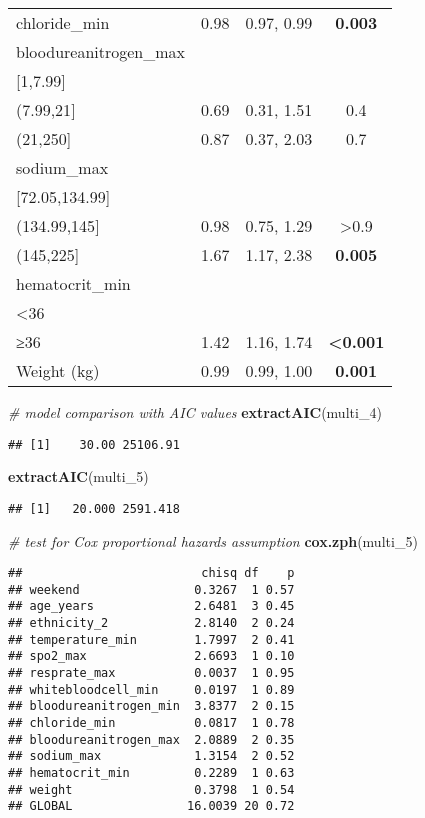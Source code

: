 \documentclass[
]{article}
\newenvironment{Shaded}{\begin{snugshade}}{\end{snugshade}}
\newcommand{\CommentTok}[1]{\textcolor[rgb]{0.56,0.35,0.01}{\textit{#1}}}
\newcommand{\FunctionTok}[1]{\textcolor[rgb]{0.13,0.29,0.53}{\textbf{#1}}}
\newcommand{\NormalTok}[1]{#1}
\begin{document}
\begin{longtable}[]{@{}lccc@{}}
chloride\_min & 0.98 & 0.97, 0.99 & \textbf{0.003} \\
bloodureanitrogen\_max & & & \\
{[}1,7.99{]} & & & \\
(7.99,21{]} & 0.69 & 0.31, 1.51 & 0.4 \\
(21,250{]} & 0.87 & 0.37, 2.03 & 0.7 \\
sodium\_max & & & \\
{[}72.05,134.99{]} & & & \\
(134.99,145{]} & 0.98 & 0.75, 1.29 & \textgreater0.9 \\
(145,225{]} & 1.67 & 1.17, 2.38 & \textbf{0.005} \\
hematocrit\_min & & & \\
\textless36 & & & \\
≥36 & 1.42 & 1.16, 1.74 & \textbf{\textless0.001} \\
Weight (kg) & 0.99 & 0.99, 1.00 & \textbf{0.001} \\
\end{longtable}

\begin{Shaded}
\begin{Highlighting}[]
\CommentTok{\# model comparison with AIC values}
\FunctionTok{extractAIC}\NormalTok{(multi\_4)}
\end{Highlighting}
\end{Shaded}

\begin{verbatim}
## [1]    30.00 25106.91
\end{verbatim}

\begin{Shaded}
\begin{Highlighting}[]
\FunctionTok{extractAIC}\NormalTok{(multi\_5)}
\end{Highlighting}
\end{Shaded}

\begin{verbatim}
## [1]   20.000 2591.418
\end{verbatim}

\begin{Shaded}
\begin{Highlighting}[]
\CommentTok{\# test for Cox proportional hazards assumption}
\FunctionTok{cox.zph}\NormalTok{(multi\_5)}
\end{Highlighting}
\end{Shaded}

\begin{verbatim}
##                         chisq df    p
## weekend                0.3267  1 0.57
## age_years              2.6481  3 0.45
## ethnicity_2            2.8140  2 0.24
## temperature_min        1.7997  2 0.41
## spo2_max               2.6693  1 0.10
## resprate_max           0.0037  1 0.95
## whitebloodcell_min     0.0197  1 0.89
## bloodureanitrogen_min  3.8377  2 0.15
## chloride_min           0.0817  1 0.78
## bloodureanitrogen_max  2.0889  2 0.35
## sodium_max             1.3154  2 0.52
## hematocrit_min         0.2289  1 0.63
## weight                 0.3798  1 0.54
## GLOBAL                16.0039 20 0.72
\end{verbatim}
\end{document}
